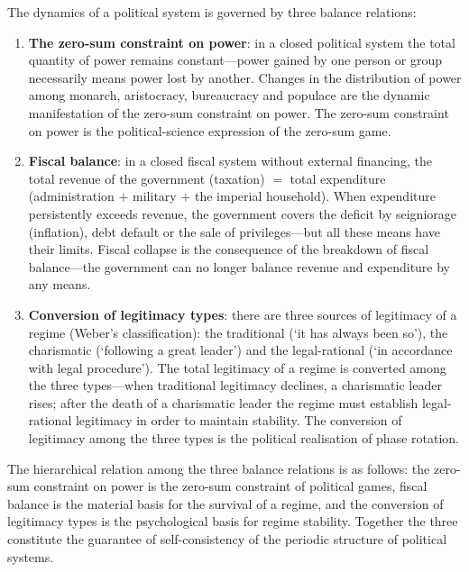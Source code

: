 \begin{theorem}\label{thm:political_conservation}
The dynamics of a political system is governed by three balance relations:
\begin{enumerate}[label=(\roman*)]
    \item \textbf{The zero-sum constraint on power}: in a closed political system the total quantity of power remains constant---power gained by one person or group necessarily means power lost by another. Changes in the distribution of power among monarch, aristocracy, bureaucracy and populace are the dynamic manifestation of the zero-sum constraint on power. The zero-sum constraint on power is the political-science expression of the zero-sum game.
    \item \textbf{Fiscal balance}: in a closed fiscal system without external financing, the total revenue of the government (taxation) $=$ total expenditure (administration $+$ military $+$ the imperial household). When expenditure persistently exceeds revenue, the government covers the deficit by seigniorage (inflation), debt default or the sale of privileges---but all these means have their limits. Fiscal collapse is the consequence of the breakdown of fiscal balance---the government can no longer balance revenue and expenditure by any means.
    \item \textbf{Conversion of legitimacy types}: there are three sources of legitimacy of a regime (Weber's classification): the traditional (`it has always been so'), the charismatic (`following a great leader') and the legal-rational (`in accordance with legal procedure'). The total legitimacy of a regime is converted among the three types---when traditional legitimacy declines, a charismatic leader rises; after the death of a charismatic leader the regime must establish legal-rational legitimacy in order to maintain stability. The conversion of legitimacy among the three types is the political realisation of phase rotation.
\end{enumerate}
The hierarchical relation among the three balance relations is as follows: the zero-sum constraint on power is the zero-sum constraint of political games, fiscal balance is the material basis for the survival of a regime, and the conversion of legitimacy types is the psychological basis for regime stability. Together the three constitute the guarantee of self-consistency of the periodic structure of political systems.
\end{theorem}

